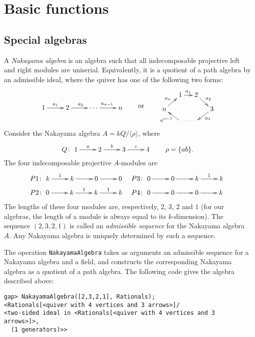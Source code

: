 \documentclass{amsart}
\theoremstyle{definition}
\newcommand{\code}[1]{\texttt{#1}}
\theoremstyle{theoretic}
\begin{document}
\section{Basic functions}

\subsection{Special algebras}

A \emph{Nakayama algebra} is an algebra such that all indecomposable
projective left and right modules are uniserial.  Equivalently, it is
a quotient of a path algebra by an admissible ideal, where the quiver
has one of the following two forms:
\[
\vcenter{\xymatrix{
1 \ar[r]^{a_1} &
2 \ar[r]^{a_2} &
\cdots
  \ar[r]^{a_{n-1}} &
n
}}
\qquad\text{or}\qquad
\vcenter{\xymatrix@R=.8em@C=1.2em{
& 
1 \ar[r]^{a_1} &
2 \ar[dr]^{a_2} \\
n \ar[ur]^{a_n} &&&
3 \ar[dl]^{a_3} \\
&
\ar[ul]^{a^{n-1}} &
\ar@{.}[l]
}}
\]
Consider the Nakayama algebra $A = kQ/\langle\rho\rangle$, where
\[
Q\colon
\xymatrix{
1 \ar[r]^{a} &
2 \ar[r]^{b} &
3 \ar[r]^{c} &
4}
\qquad
\rho = \{ ab \}.
\]
The four indecomposable projective $A$-modules are
\begin{align*}
P1&\colon
\xymatrix{
k \ar[r]^1 &
k \ar[r] &
0 \ar[r] &
0}
&
P3&\colon
\xymatrix{
0 \ar[r] &
0 \ar[r] &
k \ar[r]^1 &
k}
\\
P2&\colon
\xymatrix{
0 \ar[r] &
k \ar[r]^1 &
k \ar[r]^1 &
k}
&
P4&\colon
\xymatrix{
0 \ar[r] &
0 \ar[r] &
0 \ar[r] &
k}
\end{align*}
The lengths of these four modules are, respectively, $2$, $3$, $2$ and
$1$ (for our algebras, the length of a module is always equal to its
$k$-dimension).  The sequence $(2, 3, 2, 1)$ is called an
\emph{admissible sequence} for the Nakayama algebra~$A$.  Any Nakayama
algebra is uniquely determined by such a sequence.

The operation \code{NakayamaAlgebra} takes as arguments an admissible
sequence for a Nakayama algebra and a field, and constructs the
corresponding Nakayama algebra as a quotient of a path algebra.  The
following code gives the algebra described above:
\begin{verbatim}
gap> NakayamaAlgebra([2,3,2,1], Rationals);
<Rationals[<quiver with 4 vertices and 3 arrows>]/
<two-sided ideal in <Rationals[<quiver with 4 vertices and 3 arrows>]>, 
  (1 generators)>>
\end{verbatim}
\end{document}
